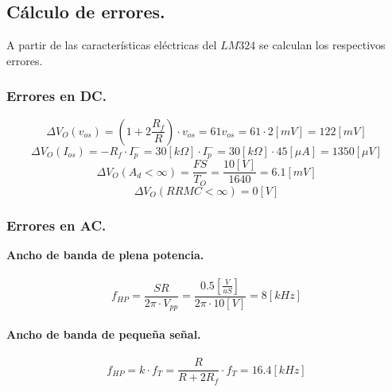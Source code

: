 \documentclass[11pt, a4paper]{article}
\begin{document}
\subsection{Cálculo de errores.}
\onehalfspacing
A partir de las características eléctricas del $LM324$ se calculan los respectivos errores.

\subsubsection{Errores en DC.}
\onehalfspacing
\begin{equation}
    \nonumber
    \Delta V_{O}(v_{os}) = \left(1+2\frac{R_f}{R}\right) \cdot v_{os} = 61v_{os} = 61\cdot 2[mV]  = 122[mV]
\end{equation}
\begin{equation}
    \nonumber
    \Delta V_{O}(I_{os}) = -R_f\cdot I_p^{-} = 30[k\Omega]\cdot I_p^{-} = 30[k\Omega]\cdot 45[\mu A]  = 1350[\mu V]
\end{equation}
\begin{equation}
    \nonumber
    \Delta V_{O}(A_d<\infty) = \frac{FS}{T_O} = \frac{10[V]}{1640} = 6.1[mV]
\end{equation}
\begin{equation}
    \nonumber
    \Delta V_{O}(RRMC<\infty) = 0[V]
\end{equation}

\subsubsection{Errores en AC.}
\onehalfspacing
\textbf{Ancho de banda de plena potencia.} 
\paragraph{}
\begin{equation}
    \nonumber
    f_{HP} = \frac{SR}{2\pi \cdot V_{pp}} =  \frac{0.5\left[ \frac{V}{uS} \right]}{2\pi \cdot 10[V]} = 8[kHz]
\end{equation}

\paragraph{}
\textbf{Ancho de banda de pequeña señal.} 
\paragraph{}
\begin{equation}
    \nonumber
    f_{HP} = k\cdot f_T = \frac{R}{R+2R_f}\cdot f_T = 16.4[kHz]
\end{equation}
\end{document}
